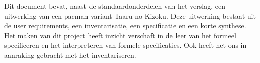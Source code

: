 
Dit document bevat, naast de standaardonderdelen van het verslag,
een uitwerking van een pacman-variant Taaru no Kizoku. Deze
uitwerking bestaat uit de user requirements, een inventarisatie, een
specificatie en een korte synthese. Het maken van dit project heeft
inzicht verschaft in de leer van het formeel specificeren en het
interpreteren van formele specificaties. Ook heeft het ons in
aanraking gebracht met het inventariseren.
